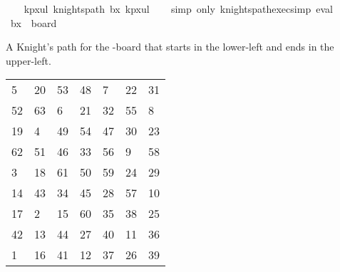 \begin{isabellebody}
\ \ {\isacharbrackleft}{\kern0pt}{}{\isacharcomma}{\kern0pt}{}{}{\isacharcomma}{\kern0pt}{}{}{\isacharcomma}{\kern0pt}{}{}{\isacharcomma}{\kern0pt}{}{}{\isacharcomma}{\kern0pt}{}{}{\isacharcomma}{\kern0pt}{}{}{\isacharcomma}{\kern0pt}{}{}{\isacharcomma}{\kern0pt}{}{}{\isacharbrackright}{\kern0pt}{\isacharbrackright}{\kern0pt}{\isacharparenright}{\kern0pt}{\isachardoublequoteclose}\isanewline
{}\isamarkupfalse%
\ kp{\isacharunderscore}{\kern0pt}{}x{}{\isacharunderscore}{\kern0pt}ul{\isacharcolon}{\kern0pt}\ {\isachardoublequoteopen}knights{\isacharunderscore}{\kern0pt}path\ b{}x{}\ kp{}x{}ul{\isachardoublequoteclose}\isanewline
%
\isadelimproof
\ \ %
\endisadelimproof
%
\isatagproof
{}\isamarkupfalse%
\ {\isacharparenleft}{\kern0pt}simp\ only{\isacharcolon}{\kern0pt}\ knights{\isacharunderscore}{\kern0pt}path{\isacharunderscore}{\kern0pt}exec{\isacharunderscore}{\kern0pt}simp{\isacharparenright}{\kern0pt}\ eval%
\endisatagproof
{\isafoldproof}%
%
\isadelimproof
\isanewline
%
\endisadelimproof
\isanewline
{}\isamarkupfalse%
\ {\isachardoublequoteopen}b{}x{}\ {\isasymequiv}\ board\ {}\ {}{\isachardoublequoteclose}%
\begin{isamarkuptext}%
A Knight's path for the -board that starts in the lower-left and ends in the 
upper-left.
  \begin{table}[H]
    \begin{tabular}{lllllll}
       5 & 20 & 53 & 48 &  7 & 22 & 31 \\
      52 & 63 &  6 & 21 & 32 & 55 &  8 \\
      19 &  4 & 49 & 54 & 47 & 30 & 23 \\
      62 & 51 & 46 & 33 & 56 &  9 & 58 \\
       3 & 18 & 61 & 50 & 59 & 24 & 29 \\
      14 & 43 & 34 & 45 & 28 & 57 & 10 \\
      17 &  2 & 15 & 60 & 35 & 38 & 25 \\
      42 & 13 & 44 & 27 & 40 & 11 & 36 \\
       1 & 16 & 41 & 12 & 37 & 26 & 39
    \end{tabular}

\end{table}
\end{isamarkuptext}
\end{isabellebody}
